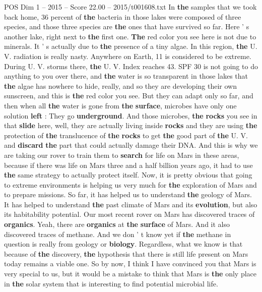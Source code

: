 \begin{textsample}{POS Dim 1 – 2015 – Score 22.00 – 2015/t001608.txt}
In \textbf{the} samples that we took back home, 36 percent of \textbf{the} bacteria in those lakes were composed of three species, and those three species are \textbf{the} ones that have survived so far.
Here ' s another lake, right next to \textbf{the} first one. \textbf{The} red color you see here is not due to minerals.
It ' s actually due to \textbf{the} presence of a tiny algae.
In this region, \textbf{the} U.
V. radiation is really nasty.
Anywhere on Earth, 11 is considered to be extreme.
During U.
V. storms there, \textbf{the} U.
V.
Index reaches 43.
SPF 30 is not going to do anything to you over there, and \textbf{the} water is so transparent in those lakes that \textbf{the} algae has nowhere to hide, really, and so they are developing their own sunscreen, and this is \textbf{the} red color you see.
But they can adapt only so far, and then when all \textbf{the} water is gone from \textbf{the} \textbf{surface}, microbes have only one solution \textbf{left} : They go \textbf{underground}.
And those microbes, \textbf{the} \textbf{rocks} you see in that \textbf{slide} here, well, they are actually living inside \textbf{rocks} and they are using \textbf{the} protection of \textbf{the} translucence of \textbf{the} \textbf{rocks} to get \textbf{the} good part of \textbf{the} U.
V. and \textbf{discard} \textbf{the} part that could actually damage their DNA.
And this is why we are taking our rover to train them to \textbf{search} for life on Mars in these areas, because if there was life on Mars three and a half billion years ago, it had to use \textbf{the} same strategy to actually protect itself.
Now, it is pretty obvious that going to extreme environments is helping us very much for \textbf{the} exploration of Mars and to prepare missions.
So far, it has helped us to understand \textbf{the} geology of Mars.
It has helped to understand \textbf{the} past climate of Mars and its \textbf{evolution}, but also its habitability potential.
Our most recent rover on Mars has discovered traces of \textbf{organics}.
Yeah, there are \textbf{organics} at \textbf{the} \textbf{surface} of Mars.
And it also discovered traces of methane.
And we don ' t know yet if \textbf{the} methane in question is really from geology or \textbf{biology}.
Regardless, what we know is that because of \textbf{the} discovery, \textbf{the} hypothesis that there is still life present on Mars today remains a viable one.
So by now, I think I have convinced you that Mars is very special to us, but it would be a mistake to think that Mars is \textbf{the} only place in \textbf{the} solar system that is interesting to find potential microbial life.

\end{textsample}
